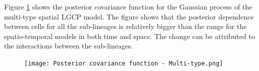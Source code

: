 Figure \ref{fig:covariance-function-multi-type} shows the posterior covariance function for the Gaussian process of the multi-type spatial LGCP model. The figure shows that the posterior dependence between cells for all the sub-lineages is relatively bigger than the range for the spatio-temporal models in both time and space. The change can be attributed to the interactions between the sub-lineages.

\begin{figure}[H]
    \begin{center}
        \texttt{[image: Posterior covariance function - Multi-type.png]}
    \end{center}
     \label{fig:covariance-function-multi-type}
\end{figure}
